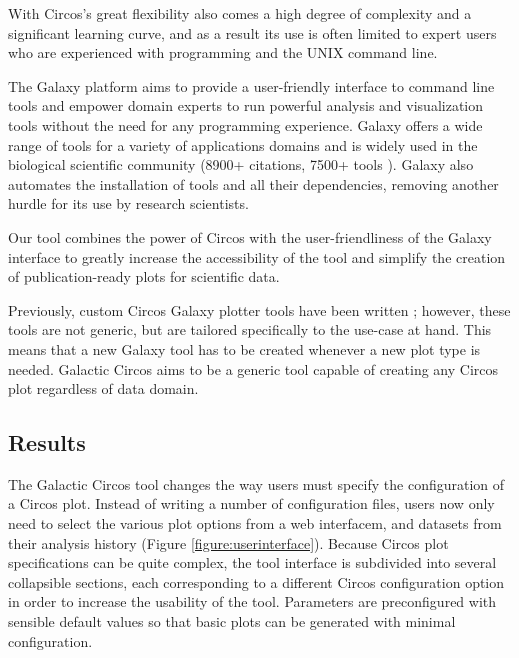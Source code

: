 With Circos's great flexibility also comes a high degree of complexity and a significant learning curve, and as a result its use is often limited to expert users who are experienced with programming and the UNIX command line.

The Galaxy platform \cite{afgan2018galaxy} aims to provide a user-friendly interface to command line tools and empower domain experts to run powerful analysis and visualization tools without the need for any programming experience. Galaxy offers a wide range of tools for a variety of applications domains and is widely used in the biological scientific community (8900+ citations, 7500+ tools \cite{galaxycitations,galaxytoolshed}). Galaxy also automates the installation of tools and all their dependencies, removing another hurdle for its use by research scientists.

Our tool combines the power of Circos with the user-friendliness of the Galaxy interface to greatly increase the accessibility of the tool and simplify the creation of publication-ready plots for scientific data.

Previously, custom Circos Galaxy plotter tools have been written \cite{hiltemann2014cgtag}; however, these tools are not generic, but are tailored specifically to the use-case at hand. This means that a new Galaxy tool has to be created whenever a new plot type is needed. Galactic Circos aims to be a generic tool capable of creating any Circos plot regardless of data domain.

\subsection*{Results}
The Galactic Circos tool changes the way users must specify the configuration of a Circos plot. Instead of writing a number of configuration files, users now only need to select the various plot options from a web interfacem, and datasets from their analysis history (Figure \ref{figure:userinterface}). Because Circos plot specifications can be quite complex, the tool interface is subdivided into several collapsible sections, each corresponding to a different Circos configuration option in order to increase the usability of the tool. Parameters are preconfigured with sensible default values so that basic plots can be generated with minimal configuration.


